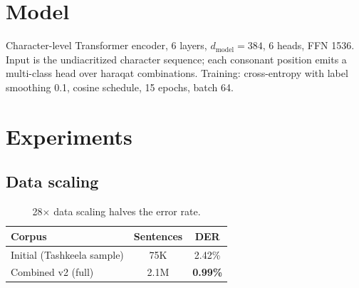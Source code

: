 \documentclass[11pt]{article}
\begin{document}
\section{Model}
Character-level Transformer encoder, 6 layers, $d_{\text{model}}=384$, 6
heads, FFN 1536. Input is the undiacritized character sequence; each
consonant position emits a multi-class head over haraqat
combinations. Training: cross-entropy with label smoothing 0.1, cosine
schedule, 15 epochs, batch 64.

\section{Experiments}
\subsection{Data scaling}
\begin{table}[h]
\centering
\begin{tabular}{lcc}
\toprule
Corpus & Sentences & DER \\
\midrule
Initial (Tashkeela sample) & 75K & 2.42\% \\
Combined v2 (full) & 2.1M & \textbf{0.99\%} \\
\bottomrule
\end{tabular}
\caption{28$\times$ data scaling halves the error rate.}
\end{table}
\end{document}
